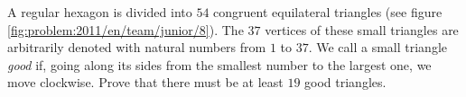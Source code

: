 %
\label{problem:2011/en/team/junior/8}%
A regular hexagon is divided into $54$ congruent equilateral triangles
(see figure \ref{fig:problem:2011/en/team/junior/8}).
The $37$ vertices of these small triangles are arbitrarily denoted with natural
numbers from $1$ to $37$.
We call a small triangle \emph{good} if, going along its sides from the
smallest number to the largest one, we move clockwise.
Prove that there must be at least $19$ good triangles.
\solution
\endproblem
